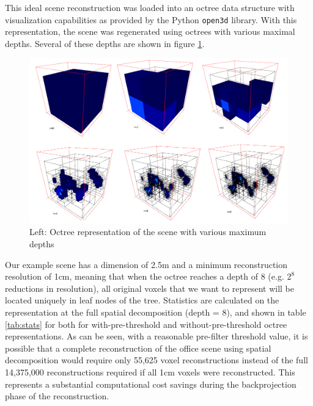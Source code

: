\documentclass[conference]{IEEEtran}
\begin{document}
This ideal scene reconstruction was loaded into an octree data structure with visualization capabilities as provided by the Python \texttt{open3d} \cite{open3d} library. With this representation, the scene was regenerated using octrees with various maximal depths. Several of these depths are shown in figure \ref{fig:octree_depths}.  

\begin{figure}
    \centering
        \includegraphics[width=\columnwidth]{figures/octree_depths.png}
    \caption{Left: Octree representation of the scene with various maximum depths}
    \label{fig:octree_depths}
\end{figure}

Our example scene has a dimension of 2.5m and a minimum reconstruction resolution of 1cm, meaning that when the octree reaches a depth of 8 (e.g. $2^8$ reductions in resolution), all original voxels that we want to represent will be located uniquely in leaf nodes of the tree. Statistics are calculated on the representation at the full spatial decomposition (depth = 8), and shown in table \ref{tab:stats} for both for with-pre-threshold and without-pre-threshold octree representations. As can be seen, with a reasonable pre-filter threshold value, it is possible that a complete reconstruction of the office scene using spatial decomposition would require only 55,625 voxel reconstructions instead of the full 14,375,000 reconstructions required if all 1cm voxels were reconstructed. This represents a substantial computational cost savings during the backprojection phase of the reconstruction.
\end{document}
